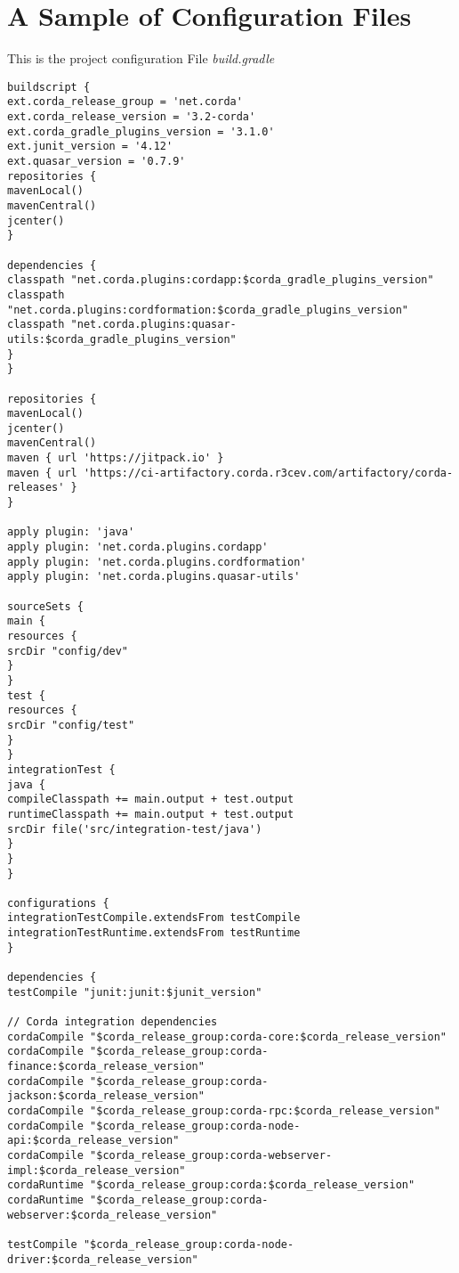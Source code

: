 \section{A Sample of Configuration Files}
This is the project configuration File \textit{build.gradle}
\begin{lstlisting}[caption={Sample of Configuration File}, label={lst:sample of configuration file}]
buildscript {
ext.corda_release_group = 'net.corda'
ext.corda_release_version = '3.2-corda'
ext.corda_gradle_plugins_version = '3.1.0'
ext.junit_version = '4.12'
ext.quasar_version = '0.7.9'
repositories {
mavenLocal()
mavenCentral()
jcenter()
}

dependencies {
classpath "net.corda.plugins:cordapp:$corda_gradle_plugins_version"
classpath "net.corda.plugins:cordformation:$corda_gradle_plugins_version"
classpath "net.corda.plugins:quasar-utils:$corda_gradle_plugins_version"
}
}

repositories {
mavenLocal()
jcenter()
mavenCentral()
maven { url 'https://jitpack.io' }
maven { url 'https://ci-artifactory.corda.r3cev.com/artifactory/corda-releases' }
}

apply plugin: 'java'
apply plugin: 'net.corda.plugins.cordapp'
apply plugin: 'net.corda.plugins.cordformation'
apply plugin: 'net.corda.plugins.quasar-utils'

sourceSets {
main {
resources {
srcDir "config/dev"
}
}
test {
resources {
srcDir "config/test"
}
}
integrationTest {
java {
compileClasspath += main.output + test.output
runtimeClasspath += main.output + test.output
srcDir file('src/integration-test/java')
}
}
}

configurations {
integrationTestCompile.extendsFrom testCompile
integrationTestRuntime.extendsFrom testRuntime
}

dependencies {
testCompile "junit:junit:$junit_version"

// Corda integration dependencies
cordaCompile "$corda_release_group:corda-core:$corda_release_version"
cordaCompile "$corda_release_group:corda-finance:$corda_release_version"
cordaCompile "$corda_release_group:corda-jackson:$corda_release_version"
cordaCompile "$corda_release_group:corda-rpc:$corda_release_version"
cordaCompile "$corda_release_group:corda-node-api:$corda_release_version"
cordaCompile "$corda_release_group:corda-webserver-impl:$corda_release_version"
cordaRuntime "$corda_release_group:corda:$corda_release_version"
cordaRuntime "$corda_release_group:corda-webserver:$corda_release_version"

testCompile "$corda_release_group:corda-node-driver:$corda_release_version"


\end{lstlisting}
